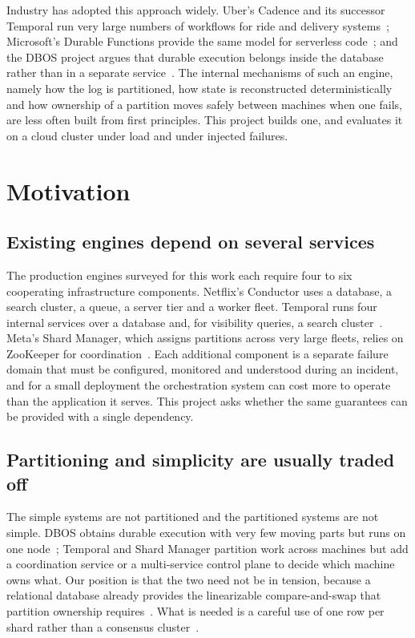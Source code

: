 Industry has adopted this approach widely. Uber's Cadence and its successor
Temporal run very large numbers of workflows for ride and delivery
systems~\cite{temporaldocs}; Microsoft's Durable Functions provide the same
model for serverless code~\cite{durablefunctions2021}; and the DBOS project
argues that durable execution belongs inside the database rather than in a
separate service~\cite{dbos2022, r3vldb2023}. The internal mechanisms of such
an engine, namely how the log is partitioned, how state is reconstructed
deterministically and how ownership of a partition moves safely between
machines when one fails, are less often built from first principles. This
project builds one, and evaluates it on a cloud cluster under load and under
injected failures.

\section{Motivation}

\subsection{Existing engines depend on several services}

The production engines surveyed for this work each require four to six
cooperating infrastructure components. Netflix's Conductor uses a database,
a search cluster, a queue, a server tier and a worker fleet. Temporal runs
four internal services over a database and, for visibility queries, a search
cluster~\cite{temporaldocs}. Meta's Shard Manager, which assigns partitions
across very large fleets, relies on ZooKeeper for coordination~\cite{shardmanager2021,
zookeeper2010}. Each additional component is a separate failure domain that
must be configured, monitored and understood during an incident, and for a
small deployment the orchestration system can cost more to operate than the
application it serves. This project asks whether the same guarantees can be
provided with a single dependency.

\subsection{Partitioning and simplicity are usually traded off}

The simple systems are not partitioned and the partitioned systems are not
simple. DBOS obtains durable execution with very few moving parts but runs on
one node~\cite{dbos2022}; Temporal and Shard Manager partition work across
machines but add a coordination service or a multi-service control plane to
decide which machine owns what. Our position is that the two need not be in
tension, because a relational database already provides the linearizable
compare-and-swap that partition ownership requires~\cite{leases1989,
kleppmann2017}. What is needed is a careful use of one row per shard rather
than a consensus cluster~\cite{raft2014}.

